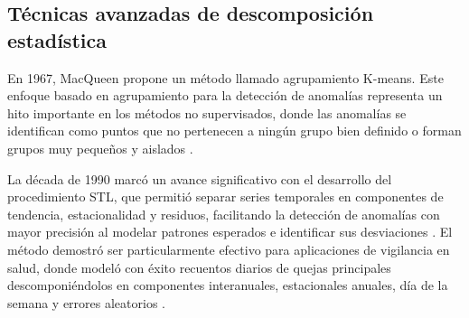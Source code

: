 \subsection{Técnicas avanzadas de descomposición estadística}

En 1967, MacQueen  propone un método llamado  agrupamiento K-means. Este enfoque basado en agrupamiento para la detección de anomalías representa un hito importante en los métodos no supervisados, donde las anomalías se identifican como puntos que no pertenecen a ningún grupo bien definido o forman grupos muy pequeños y aislados \cite{morissette_k-means_2013}.

La década de 1990 marcó un avance significativo con el desarrollo del procedimiento STL, que permitió separar series temporales en componentes de tendencia, estacionalidad y residuos, facilitando la detección de anomalías con mayor precisión al modelar patrones esperados e identificar sus desviaciones \cite{cleveland_stl_1990}. El método demostró ser particularmente efectivo para aplicaciones de vigilancia en salud, donde modeló con éxito recuentos diarios de quejas principales descomponiéndolos en componentes interanuales, estacionales anuales, día de la semana y errores aleatorios \cite{hafen_syndromic_2009}. 
